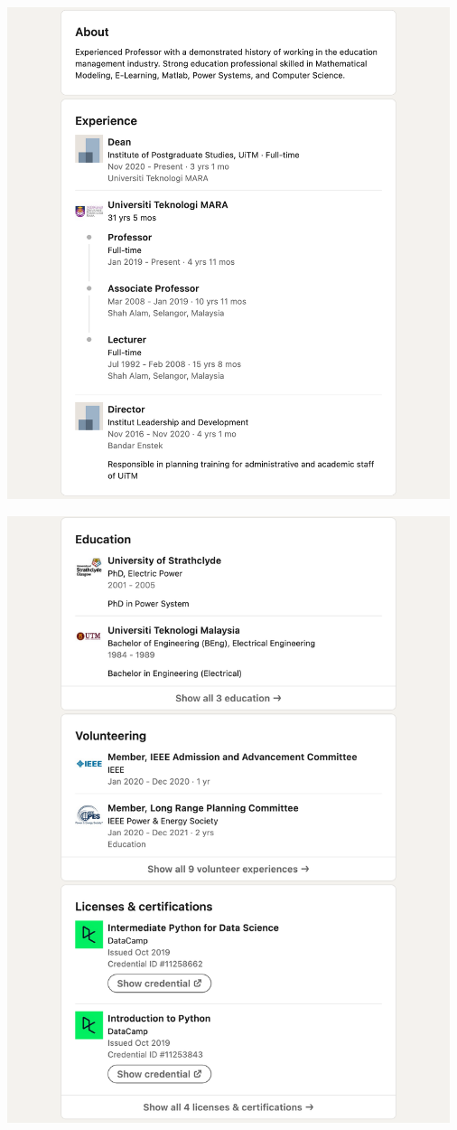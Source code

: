 \Continuing
\begin{center}
    \includegraphics[width=35em]{zakaria-linkedin-p2}
\end{center}
\WillContinue
\pagebreak

\Continuing
\begin{center}
    \includegraphics[width=35em]{zakaria-linkedin-p3}
\end{center}
\WillContinue
\pagebreak

